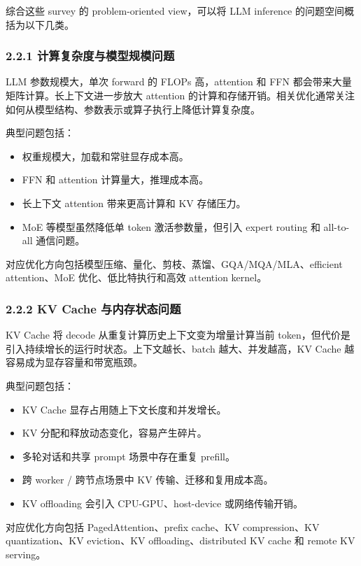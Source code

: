 \documentclass[a4paper,10pt]{ctexart}
\begin{document}
综合这些 survey 的 problem-oriented view，可以将 LLM inference 的问题空间概括为以下几类。




\subsubsection*{2.2.1 计算复杂度与模型规模问题}

LLM 参数规模大，单次 forward 的 FLOPs 高，attention 和 FFN 都会带来大量矩阵计算。长上下文进一步放大 attention 的计算和存储开销。相关优化通常关注如何从模型结构、参数表示或算子执行上降低计算复杂度。


典型问题包括：


\begin{itemize}
\item 权重规模大，加载和常驻显存成本高。

\item FFN 和 attention 计算量大，推理成本高。

\item 长上下文 attention 带来更高计算和 KV 存储压力。

\item MoE 等模型虽然降低单 token 激活参数量，但引入 expert routing 和 all-to-all 通信问题。

\end{itemize}
对应优化方向包括模型压缩、量化、剪枝、蒸馏、GQA/MQA/MLA、efficient attention、MoE 优化、低比特执行和高效 attention kernel。




\subsubsection*{2.2.2 KV Cache 与内存状态问题}

KV Cache 将 decode 从重复计算历史上下文变为增量计算当前 token，但代价是引入持续增长的运行时状态。上下文越长、batch 越大、并发越高，KV Cache 越容易成为显存容量和带宽瓶颈。


典型问题包括：


\begin{itemize}
\item KV Cache 显存占用随上下文长度和并发增长。

\item KV 分配和释放动态变化，容易产生碎片。

\item 多轮对话和共享 prompt 场景中存在重复 prefill。

\item 跨 worker / 跨节点场景中 KV 传输、迁移和复用成本高。

\item KV offloading 会引入 CPU-GPU、host-device 或网络传输开销。

\end{itemize}
对应优化方向包括 PagedAttention、prefix cache、KV compression、KV quantization、KV eviction、KV offloading、distributed KV cache 和 remote KV serving。
\end{document}
